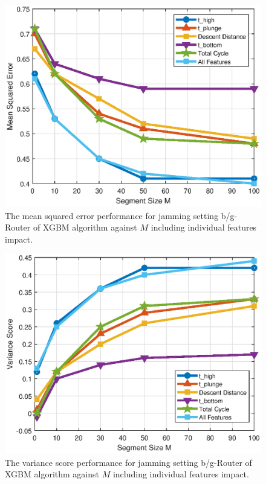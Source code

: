 \begin{figure}[!ht]
	\centering
	\includegraphics[width=0.9\columnwidth]{./chapter-ftml/plots/001_MSE_F_3.eps}
	\caption{The mean squared error performance for jamming setting b/g-Router of XGBM algorithm against $M$ including individual features impact.}
	\label{ftml-jrnl:fig:001_MSE_F_3}      
\end{figure}

\begin{figure}[!ht]
	\centering
	\includegraphics[width=0.9\columnwidth]{./chapter-ftml/plots/001_R2_F_3.eps}
	\caption{The variance score performance for jamming setting b/g-Router of XGBM algorithm against $M$ including individual features impact.}
	\label{ftml-jrnl:fig:001_R2_F_3}      
\end{figure}

